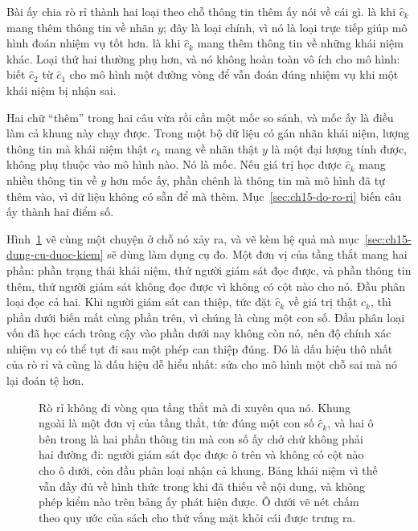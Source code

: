 %
Bài ấy chia rò rỉ thành hai loại theo chỗ thông tin thêm ấy nói về cái
gì.  là khi $\hat c_k$ mang
thêm thông tin về nhãn $y$;
đây là loại chính, vì nó là loại trực tiếp giúp mô hình đoán nhiệm vụ tốt hơn.
 là khi $\hat c_k$ mang thêm thông tin về những khái niệm
khác. Loại thứ hai thường phụ hơn, và nó không hoàn toàn vô ích cho mô hình:
biết $\hat c_2$ từ $\hat c_1$ cho mô hình một đường vòng để vẫn đoán đúng nhiệm
vụ khi một khái niệm bị nhận sai.

%
Hai chữ \enquote{thêm} trong hai câu vừa rồi cần một mốc so sánh, và mốc ấy là
điều làm cả khung này chạy được. Trong một bộ dữ liệu có gán nhãn khái niệm,
lượng thông tin mà khái niệm thật $c_k$ mang về nhãn thật $y$ là một đại lượng
tính được, không phụ thuộc vào mô hình nào. Nó là mốc. Nếu giá trị học được
$\hat c_k$ mang nhiều thông tin về $y$ hơn mốc ấy, phần chênh là thông tin mà mô
hình đã tự thêm vào, vì dữ liệu không có sẵn để mà thêm. Mục~\ref{sec:ch15-do-ro-ri}
biến câu ấy thành hai điểm số.

%
Hình~\ref{fig:ch15-nut-that-va-ro-ri} vẽ cùng một chuyện ở chỗ nó xảy ra, và vẽ
kèm hệ quả mà mục~\ref{sec:ch15-dung-cu-duoc-kiem} sẽ dùng làm dụng cụ đo. Một
đơn vị của tầng thắt mang hai phần: phần trạng thái khái niệm, thứ người giám
sát đọc được, và phần thông tin thêm, thứ người giám sát không đọc được vì không
có cột nào cho nó. Đầu phân loại đọc cả hai. Khi người giám sát can thiệp, tức
đặt $\hat c_k$ về giá trị thật $c_k$, thì phần dưới biến mất cùng phần trên, vì
chúng là cùng một con số. Đầu phân loại vốn đã học cách trông cậy vào phần dưới
nay không còn nó, nên độ chính xác nhiệm vụ có thể tụt đi sau một phép can thiệp
đúng. Đó là dấu hiệu thô nhất của rò rỉ và cũng là dấu hiệu dễ hiểu nhất: sửa
cho mô hình một chỗ sai mà nó lại đoán tệ hơn.

\begin{figure}[htbp]
  \centering
  
  \caption{Rò rỉ không đi vòng qua tầng thắt mà đi xuyên qua nó. Khung ngoài là
  một đơn vị của tầng thắt, tức đúng một con số $\hat c_k$, và hai ô bên trong
  là hai phần thông tin mà con số ấy chở chứ không phải hai đường đi: người giám
  sát đọc được ô trên và không có cột nào cho ô dưới, còn đầu phân loại nhận cả
  khung. Bảng khái niệm vì thế vẫn đầy đủ về hình thức trong khi đã thiếu về nội
  dung, và không phép kiểm nào trên bảng ấy phát hiện được. Ô dưới vẽ nét chấm
  theo quy ước của sách cho thứ vắng mặt khỏi cái được trưng ra.}
  \label{fig:ch15-nut-that-va-ro-ri}
\end{figure}

